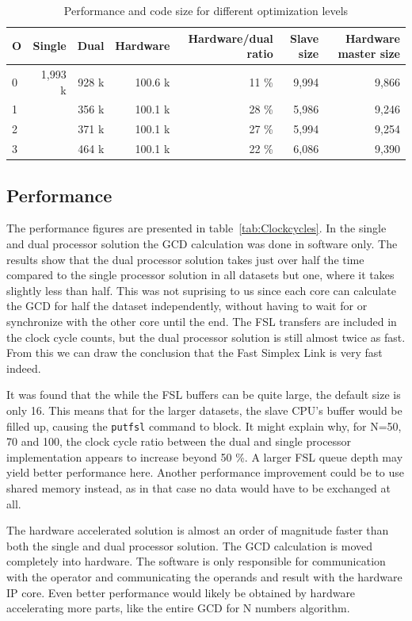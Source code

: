 \documentclass[11pt]{article}
\begin{document}
\begin{table}[htbp]
  \centering
  \begin{tabular}{l|rrrrrr}
    \toprule
    O & Single  & Dual  & Hardware  & Hardware/dual ratio & Slave size & Hardware master size \\
    \midrule
    0 & 1,993 k & 928 k & 100.6 k & 11 \% & 9,994 & 9,866 \\
    1 &         & 356 k & 100.1 k & 28 \% & 5,986 & 9,246 \\
    2 &         & 371 k & 100.1 k & 27 \% & 5,994 & 9,254 \\
    3 &         & 464 k & 100.1 k & 22 \% & 6,086 & 9,390 \\
    \bottomrule
  \end{tabular}
  \caption{Performance and code size for different optimization levels}
  \label{tab:opt}
\end{table}

\subsection{Performance}
The performance figures are presented in table~\ref{tab:Clockcycles}. In the single and dual processor solution the GCD calculation was done in software only. The results show that the dual processor solution takes just over half the time compared to the single processor solution in all datasets but one, where it takes slightly less than half. This was not suprising to us since each core can calculate the GCD for half the dataset independently, without having to wait for or synchronize with the other core until the end. The FSL transfers are included in the clock cycle counts, but the dual processor solution is still almost twice as fast. From this we can draw the conclusion that the Fast Simplex Link is very fast indeed.

It was found that the while the FSL buffers can be quite large, the default size is only 16\cite{fsl}. This means that for the larger datasets, the slave CPU's buffer would be filled up, causing the \texttt{putfsl} command to block. It might explain why, for N=50, 70 and 100, the clock cycle ratio between the dual and single processor implementation appears to increase beyond 50 \%. A larger FSL queue depth may yield better performance here. Another performance improvement could be to use shared memory instead, as in that case no data would have to be exchanged at all.

The hardware accelerated solution is almost an order of magnitude faster than both the single and dual processor solution. The GCD calculation is moved completely into hardware. The software is only responsible for communication with the operator and communicating the operands and result with the hardware IP core. Even better performance would likely be obtained by hardware accelerating more parts, like the entire GCD for N numbers algorithm.
\end{document}
